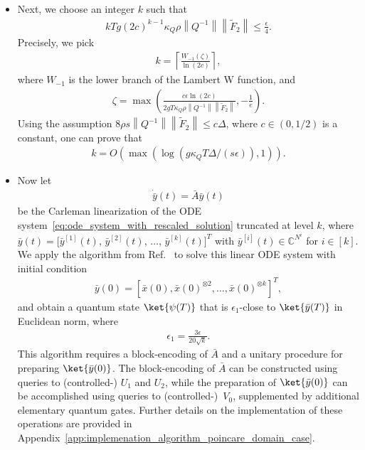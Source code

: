 \documentclass[superscriptaddress,onecolumn,nofootinbib,longbibliography,a4paper,accepted=2026-09-29]{quantumarticle}
\theoremstyle{plain}
\theoremstyle{definition}
\numberwithin{thm}{section}
\numberwithin{assumption}{section}
\numberwithin{lemma}{section}
\numberwithin{prop}{section}
\numberwithin{cor}{section}
\numberwithin{definition}{section}
\numberwithin{rmk}{section}
\numberwithin{equation}{section}
\newcommand{\norm}[1]     {\left\| #1 \right\|}
\newcommand{\myC}{\mathbb{C}}
\newcommand{\lrb}[1]{\left ( #1 \right )}
\newcommand{\mylog}[1]{\operatorname{log} \lrb{#1}}
\newcommand{\myln}[1]{\operatorname{ln} \lrb{#1}}
\newcommand{\mymax}[1]{\operatorname{max}\lrb{#1}}
\newcommand{\myO}[1]{O\lrb{#1}}
\begin{document}
\begin{itemize}
\item Next, we choose an integer $k$ such that
\begin{align}
     k T g (2c)^{k-1} \kappa_Q  \rho  \norm{Q^{-1}}\norm{\tilde{F}_2} \le \frac{\epsilon}{4}.
\end{align}
Precisely, we pick
\begin{align}
k = \left\lceil \frac{W_{-1}\lrb{\zeta}}{\myln{2c}} \right\rceil,
\label{eq:def_truncation_order_k}
\end{align}
where $W_{-1}$ is the lower branch of the Lambert W function, and
\begin{align}
\zeta =\mymax{\frac{c\epsilon\myln{2c}}{2gT\kappa_Q\rho\norm{Q^{-1}}\norm{\tilde{F}_2}}, -\frac{1}{e}}.
\end{align}
Using the assumption $8\rho s \norm{Q^{-1}} \norm{\tilde{F}_2} \le c\Delta$, where $c \in (0, 1/2)$ is a constant, one can prove that
\begin{align}
k=\myO{\max(\mylog{ g \kappa_Q T \Delta/(s\epsilon)}, 1)}.
\end{align}
\item Now let 
\begin{align}
\dot{\bar{y}}(t) = \bar{A} \bar{y}(t)
\label{eq:carleman_linearized_system_rescaled}
\end{align}
be the Carleman linearization of the ODE system~\eqref{eq:ode_system_with_rescaled_solution} truncated at level $k$, where $\bar{y}(t)=[\bar{y}^{[1]}(t)$, $\bar{y}^{[2]}(t)$, $\dots$, $\bar{y}^{[k]}(t)]^T$ with $\bar{y}^{[i]}(t) \in \myC^{N^i}$ 
for $i \in [k]$. We apply the algorithm from Ref.~\cite{jennings2023cost} to solve this linear ODE system with initial condition 
\begin{align}
\bar{y}(0)=[\bar{x}(0), \bar{x}(0)^{\otimes 2}, \dots, \bar{x}(0)^{\otimes k}]^T,    
\end{align}
and obtain a quantum state $\ket{\psi(T)}$ that is $\epsilon_1$-close to $\ket{\bar{y}(T)}$ in Euclidean norm, where 
\begin{align}
\epsilon_1=\frac{3\epsilon}{20\sqrt{k}}.    
\end{align}
This algorithm requires a block-encoding of $\bar{A}$ and a unitary procedure for preparing $\ket{\bar{y}(0)}$. The block-encoding of $\bar{A}$ can be constructed using queries to (controlled-) $U_1$ and $U_2$, while the preparation of $\ket{\bar{y}(0)}$ can be accomplished using queries to (controlled-)~$V_0$, supplemented by additional elementary quantum gates. Further details on the implementation of these operations are provided in Appendix~\ref{app:implemenation_algorithm_poincare_domain_case}.

\end{itemize}
\end{document}
